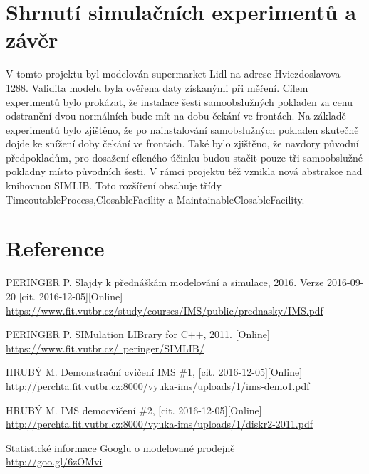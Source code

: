 \documentclass[12pt,a4paper,titlepage]{article}
\begin{document}
\section{Shrnutí simulačních experimentů a závěr}
V tomto projektu byl modelován supermarket Lidl na adrese Hviezdoslavova 1288. Validita modelu byla ověřena daty získanými při měření. Cílem experimentů bylo prokázat, že instalace šesti samoobslužných pokladen za cenu odstranění dvou normálních bude mít na dobu čekání ve frontách. Na základě experimentů bylo zjištěno, že po nainstalování samobslužných pokladen skutečně dojde ke snížení doby čekání ve frontách. Také bylo zjištěno, že navdory původní předpokladům, pro dosažení cíleného účinku budou stačit pouze tři samoobslužné pokladny místo původních šesti. V rámci projektu též vznikla nová abstrakce nad knihovnou SIMLIB. Toto rozšíření   obsahuje třídy TimeoutableProcess,ClosableFacility a MaintainableClosableFacility. 

\section*{Reference}
\begin{enumerate}[label={[\arabic*]}]
\item PERINGER P. Slajdy k přednáškám modelování a simulace, 2016. Verze  2016-09-20 [cit. 2016-12-05][Online] \\
     \href{https://www.fit.vutbr.cz/study/courses/IMS/public/prednasky/IMS.pdf}
          {https://www.fit.vutbr.cz/study/courses/IMS/public/prednasky/IMS.pdf}
     \label{prezentace}

\item PERINGER P. SIMulation LIBrary for C++, 2011. [Online] \\
    \href{https://www.fit.vutbr.cz/~peringer/SIMLIB/}
         {https://www.fit.vutbr.cz/~peringer/SIMLIB/}
    \label{demo1}

\item HRUBÝ M. Demonstrační cvičení IMS \#1, [cit. 2016-12-05][Online] \\
    \href{http://perchta.fit.vutbr.cz:8000/vyuka-ims/uploads/1/ims-demo1.pdf}
        {http://perchta.fit.vutbr.cz:8000/vyuka-ims/uploads/1/ims-demo1.pdf}
    \label{demo2}

\item HRUBÝ M. IMS democvičení \#2, [cit. 2016-12-05][Online] \\
    \href{http://perchta.fit.vutbr.cz:8000/vyuka-ims/uploads/1/diskr2-2011.pdf}
        {http://perchta.fit.vutbr.cz:8000/vyuka-ims/uploads/1/diskr2-2011.pdf}
    \label{simlib}

\item Statistické informace Googlu o modelované prodejně \\
     \href{http://goo.gl/6zOMvi}
          {http://goo.gl/6zOMvi}
     \label{google-shop}
\end{enumerate}
\end{document}
